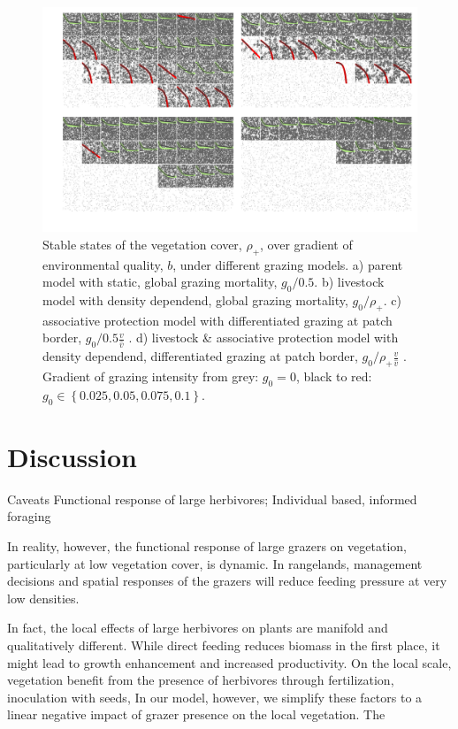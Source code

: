 \begin{figure}[h]%
\includegraphics[width=\columnwidth]{figures/patterns.pdf}%
\caption{Stable states of the vegetation cover, $\rho_+$, over gradient of environmental quality, $b$, under different grazing models. a) parent model with static, global grazing mortality, $g_0/0.5$. b) livestock model with density dependend, global grazing mortality, $g_0 / \rho_+$. c) associative protection model with differentiated grazing at patch border, $g_0/0.5 \frac{v}{\hat{v}}$ . d) livestock \& associative protection model with density dependend, differentiated grazing at patch border,  $g_0/ \rho_+ \frac{v}{\hat{v}}$ . Gradient of grazing intensity from grey: $g_0 = 0$, black to red: $g_0 \in \left\{ 0.025, 0.05, 0.075, 0.1 \right\}$.}%
\label{}%
\end{figure}



\section{Discussion}

Caveats
Functional response of large herbivores; Individual based, informed foraging


In reality, however, the functional response of large grazers on vegetation, particularly at low vegetation cover, is dynamic. In rangelands, management decisions and spatial responses of the grazers will reduce feeding pressure at very low densities. 

In fact, the local effects of large herbivores on plants are manifold and qualitatively different. While direct feeding reduces biomass in the first place, it might lead to growth enhancement and increased productivity. On the local scale, vegetation benefit from the presence of herbivores through fertilization, inoculation with seeds, 
In our model, however, we simplify these factors to a linear negative impact of grazer presence on the local vegetation. The  

